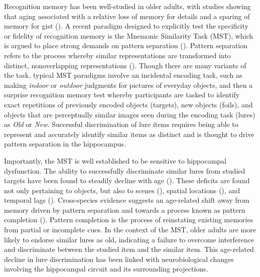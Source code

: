 \documentclass[11pt]{article}
\begin{document}
Recognition memory has been well-studied in older adults, with studies showing that aging associated with a relative loss of memory for details and a sparing of memory for gist (\cite{schacter_false_1997}). A recent paradigm designed to explicitly test the specificity or fidelity of recognition memory is the Mnemonic Similarity Task (MST), which is argued to place strong demands on pattern separation (\cite{stark_task_2013, stark_mnemonic_2019}). Pattern separation refers to the process whereby similar representations are transformed into distinct, nonoverlapping representations (\cite{yassa_pattern_2011}). Though there are many variants of the task, typical MST paradigms involve an incidental encoding task, such as making \textit{indoor} or \textit{outdoor} judgments for pictures of everyday objects, and then a surprise recognition memory test whereby participants are tasked to identify exact repetitions of previously encoded objects (targets), new objects (foils), and objects that are perceptually similar images seen during the encoding task (lures) as \textit{Old} or \textit{New}. Successful discrimination of lure items requires being able to represent and accurately identify similar items as distinct and is thought to drive pattern separation in the hippocampus. 

Importantly, the MST is well established to be sensitive to hippocampal dysfunction. The ability to successfully discriminate similar lures from studied targets have been found to steadily decline with age (\cite{stark_task_2013, stark_stability_2015, stark_mnemonic_2019}). These deficits are found not only pertaining to objects, but also to scenes (\cite{stark_age-related_2017}), spatial locations (\cite{reagh_spatial_2014, reagh_greater_2016, reagh_functional_2018}), and temporal lags (\cite{roberts_temporal_2014}). Cross-species evidence suggests an age-related shift away from memory driven by pattern separation and towards a process known as pattern completion (\cite{leal_neurocognitive_2015}). Pattern completion is the process of reinstating existing memories from partial or incomplete cues. In the context of the MST, older adults are more likely to endorse similar lures as old, indicating a failure to overcome interference and discriminate between the studied item and the similar item. This age-related decline in lure discrimination has been linked with neurobiological changes involving the hippocampal circuit and its surrounding projections.
\end{document}
